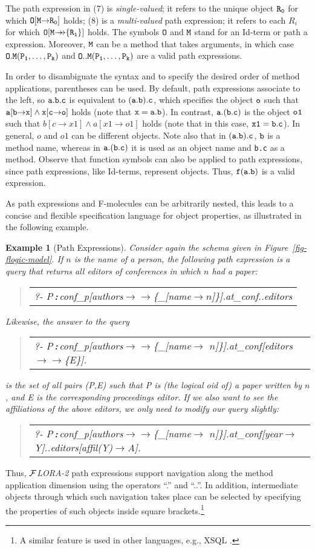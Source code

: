\documentclass[11pt]{article}
\newtheorem{example}{Example}[section]
\newenvironment{qrules}{\begin{quote}\tt\begin{tabular}[t]{l}}%
{\end{tabular}\end{quote}}
\newcommand{\isa}{\,{\bf{:}}\,}
\newcommand{\fd}{\ensuremath{{\rightarrow}}}                   %
\newcommand{\mvd}{\ensuremath{{\rightarrow\!\!\!\!\rightarrow}}}  %
\newcommand{\anon}{\_}
\newcommand{\FLORA}{{\mbox{${\cal F}${\small\it LORA}\rm\emph{-2}}}\xspace}
\begin{document}
\noindent
The path expression in (7) is \emph{single-valued}; it refers to the unique
object $\tt R_0$ for which $\tt O[M\fd R_0]$ holds; (8) is a
\emph{multi-valued} path expression; it refers to each $R_i$ for which $\tt
O[M\mvd\{R_i\}]$ holds.  The symbols $\tt O$ and $\tt M$ stand for an
Id-term or path a expression.  Moreover, $\tt M$ can be a method that takes
arguments, in which case $\tt O.M(P_1,\dots,P_k)$ and $\tt
O..M(P_1,\dots,P_k)$ are a valid path expressions.
  
In order to disambiguate the syntax and to specify the desired order of
method applications, parentheses can be used. By default, path expressions
associate to the left, so $\tt a.b.c$ is equivalent to $\tt (a.b).c$, which
specifies the object $\tt o$ such that $\tt a[b\fd x] \land x[c\fd o]$
holds (note that $\tt x=a.b$). In contrast, $\tt a.(b.c)$ is the object
$\tt o1$ such that $b[c\fd x1] \land a[x1\fd o1]$ holds (note that in this
case, $\tt x1=b.c$). In general, $o$ and $o1$ can be different objects.
Note also that in $\tt (a.b).c$, $\tt b$ is a method name, whereas in $\tt
a.(b.c)$ it is used as an object name and {\tt b.c} as a method.  Observe
that function symbols can also be applied to path expressions, since path
expressions, like Id-terms, represent objects. Thus, $\tt f(a.b)$
is a valid expression.

As path expressions and F-molecules can be arbitrarily nested, this leads
to a concise and flexible specification language for object properties, as
illustrated in the following example.

\begin{example}[Path Expressions]\label{Ex:PathExpr}
  \rm Consider again the schema given in Figure~\ref{fig-flogic-model}.  If
  $n$ is the name of a person, the following path expression is a query
  that returns all editors of conferences in which $n$ had a paper:
  \begin{qrules}
    ?- P\isa conf\_p[authors\mvd\{\anon [name\fd $n$]\}].at\_conf..editors
  \end{qrules}
  Likewise, the answer to the query
  \begin{qrules}
    ?- P\isa conf\_p[authors\mvd\{\anon [name\fd
    $n$]\}].at\_conf[editors\mvd\{E\}].
  \end{qrules}
  is the set of all pairs (\textsf{P},\textsf{E}) such that \textsf{P} is
  (the logical oid of) a paper written by $n$, and \textsf{E} is the
  corresponding proceedings editor.  If we also want to see the
  affiliations of the above editors, we only need to modify our query
  slightly:
  \begin{qrules}
    ?- P\isa conf\_p[authors\mvd\{\anon [name\fd
    $n$]\}].at\_conf[year\fd Y]..editors[affil(Y)\fd A].
  \end{qrules}
\end{example}
Thus, \FLORA path expressions support navigation 
along the method application dimension using the operators
``.''  and
``..''. In addition, intermediate objects through which such navigation
takes place can be selected by specifying the properties of such objects
inside square brackets.\footnote{
  A similar feature is used in other languages, e.g., XSQL \cite{xsql-92}.
  }
\end{document}
